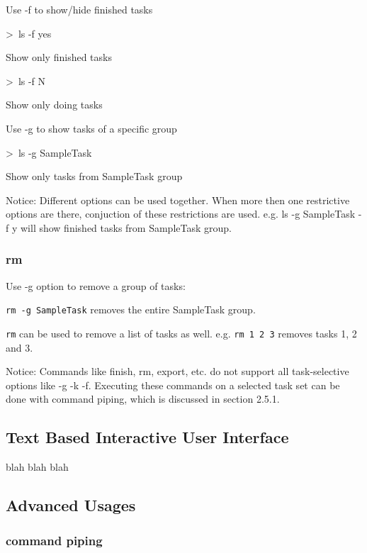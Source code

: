 \documentclass[12pt, a4paper]{article}
\begin{document}
Use -f to show/hide finished tasks

    \textgreater \ ls -f yes

    Show only finished tasks

    \textgreater \ ls -f N

    Show only doing tasks

Use -g to show tasks of a specific group

    \textgreater \ ls -g SampleTask

    Show only tasks from SampleTask group

Notice: Different options can be used together.
        When more then one restrictive options are there, conjuction of these restrictions are used.
        e.g. ls -g SampleTask -f y will show finished tasks from SampleTask group. 

\subsubsection{rm}
Use -g option to remove a group of tasks:

\texttt{rm -g SampleTask} removes the entire SampleTask group.

\texttt{rm} can be used to remove a list of tasks as well. e.g. \texttt{rm 1 2 3} removes tasks 1, 2 and 3.


Notice: Commands like finish, rm, export, etc. do not support all task-selective options like -g -k -f.
Executing these commands on a selected task set can be done with command piping, which is discussed in section 2.5.1.

\subsection{Text Based Interactive User Interface}
blah blah blah

\subsection{Advanced Usages}
\subsubsection{command piping}
\end{document}
